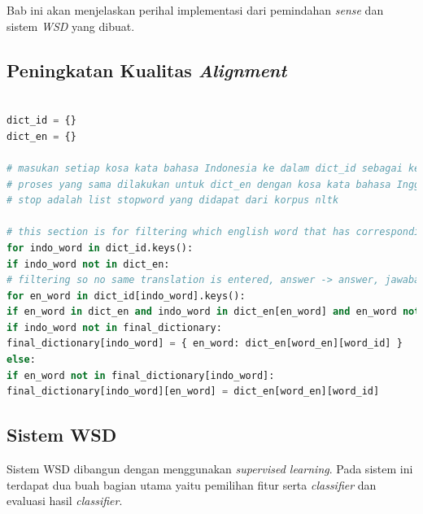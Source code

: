 \chapter{\babEmpat} \label{implementasi}
Bab ini akan menjelaskan perihal implementasi dari pemindahan \textit{sense} dan sistem \textit{WSD} yang dibuat.


\section{Peningkatan Kualitas \textit{Alignment}}

\begin{lstlisting}[language=Python, caption={Word Alignment Enhancement}, label={word-alignment-enhancement}]

dict_id = {}
dict_en = {}

# masukan setiap kosa kata bahasa Indonesia ke dalam dict_id sebagai key dan kumpulan pasangan kata bahasa inggrisnya sebagai value
# proses yang sama dilakukan untuk dict_en dengan kosa kata bahasa Inggris sebagai key dan kumpulan pasangan kata bahasa Indonesia sebagai value
# stop adalah list stopword yang didapat dari korpus nltk

# this section is for filtering which english word that has corresponding indo translation (bidirectional) from Giza output
for indo_word in dict_id.keys():
if indo_word not in dict_en:
# filtering so no same translation is entered, answer -> answer, jawaban -> jawaban
for en_word in dict_id[indo_word].keys():
if en_word in dict_en and indo_word in dict_en[en_word] and en_word not in stop:
if indo_word not in final_dictionary:
final_dictionary[indo_word] = { en_word: dict_en[word_en][word_id] }
else:
if en_word not in final_dictionary[indo_word]:
final_dictionary[indo_word][en_word] = dict_en[word_en][word_id]
\end{lstlisting}

\section{Sistem WSD}
Sistem WSD dibangun dengan menggunakan \textit{supervised learning}. Pada sistem ini terdapat dua buah bagian utama yaitu pemilihan fitur serta \textit{classifier} dan evaluasi hasil \textit{classifier}.

